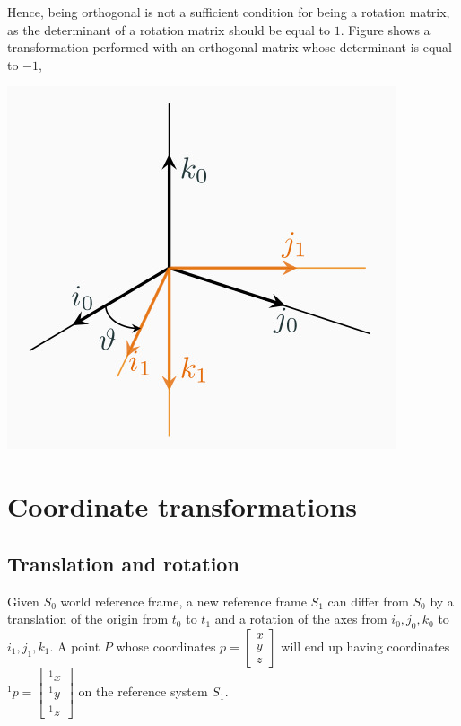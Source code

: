 \documentclass[10pt]{report}
\begin{document}
Hence, being orthogonal is not a sufficient condition for being a rotation matrix, as the determinant of a rotation matrix should be equal to \(1\). Figure shows a transformation performed with an orthogonal matrix whose determinant is equal to \(-1\),

\begin{center}
\includegraphics[scale=0.3]{./pics/alg/neg-rot.jpg}
\end{center}
\clearpage
\section{Coordinate transformations}
\label{sec:org03af325}
\subsection{Translation and rotation}
\label{sec:org3500019}
Given \(S_0\) world reference frame, a new reference frame \(S_1\) can differ from \(S_0\) by a translation of the origin from \(t_0\) to \(t_1\) and a rotation of the axes from \(i_0, j_0, k_0\) to \(i_1, j_1, k_1\). A point \(P\) whose coordinates \(p = \begin{bmatrix}x \\ y \\ z\end{bmatrix}\) will end up having coordinates \({}^1 p = \begin{bmatrix}{}^1 x \\ {}^1 y \\ {}^1 z\end{bmatrix}\) on the reference system \(S_1\).
\end{document}

